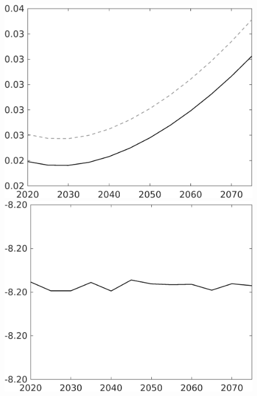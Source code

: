 \documentclass[12pt]{article}
\begin{document}
\begin{figure}
\begin{minipage}[]{0.32\textwidth}
	\end{minipage}	
	\begin{minipage}[]{0.32\textwidth}
		\includegraphics[width=1\textwidth]{../../codding_model/own_basedOnFried/optimalPol_010922_revision/figures/all_13Sept22/CompTaul_Equlab_LFBAU_Reg0_wsg_spillover0_nsk1_xgr0_knspil0_sep1_countec0_GovRev0_etaa0.79_lgd0.png}
	\end{minipage}	
	\begin{minipage}[]{0.32\textwidth}
		\includegraphics[width=1\textwidth]{../../codding_model/own_basedOnFried/optimalPol_010922_revision/figures/all_13Sept22/CompTaul_Equlab_LFBAUPer_Reg0_wsn_spillover0_nsk1_xgr0_knspil0_sep1_countec0_GovRev0_etaa0.79.png}

\end{minipage}
\end{figure}
\end{document}
